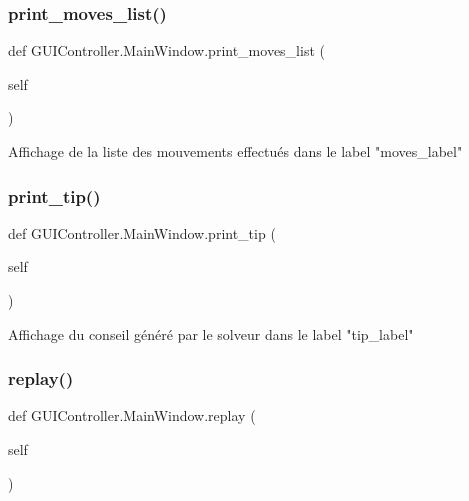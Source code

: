 \subsubsection{\texorpdfstring{print\+\_\+moves\+\_\+list()}{print\_moves\_list()}}
{\footnotesize\ttfamily def G\+U\+I\+Controller.\+Main\+Window.\+print\+\_\+moves\+\_\+list (\begin{DoxyParamCaption}\item[{}]{self }\end{DoxyParamCaption})}

\begin{DoxyVerb}Affichage de la liste des mouvements effectués dans le label "moves_label" \end{DoxyVerb}
 \mbox{\label{classGUIController_1_1MainWindow_a9801fb2a06f3308baaaf617b91245d0d}} 
\subsubsection{\texorpdfstring{print\+\_\+tip()}{print\_tip()}}
{\footnotesize\ttfamily def G\+U\+I\+Controller.\+Main\+Window.\+print\+\_\+tip (\begin{DoxyParamCaption}\item[{}]{self }\end{DoxyParamCaption})}

\begin{DoxyVerb}Affichage du conseil généré par le solveur  dans le label "tip_label" \end{DoxyVerb}
 \mbox{\label{classGUIController_1_1MainWindow_a60a31538c9b32fc3b1c9aff8bb659e11}} 
\subsubsection{\texorpdfstring{replay()}{replay()}}
{\footnotesize\ttfamily def G\+U\+I\+Controller.\+Main\+Window.\+replay (\begin{DoxyParamCaption}\item[{}]{self }\end{DoxyParamCaption})}

